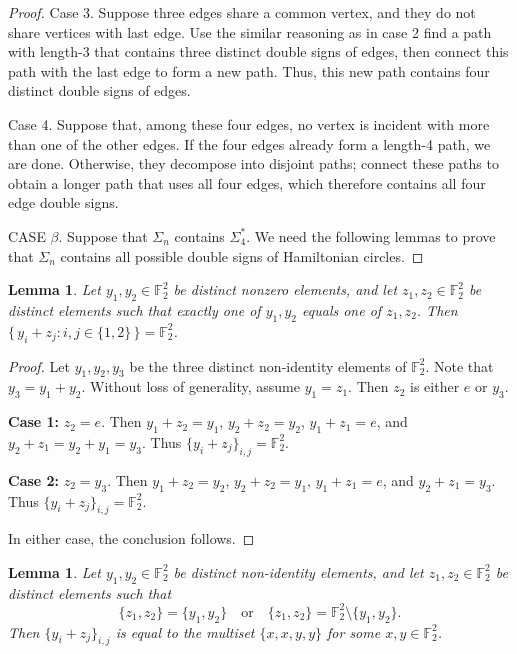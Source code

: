 \documentclass[12pt]{amsart}
\theoremstyle{plain}
\newtheorem{lemma}[theorem]{Lemma}
\theoremstyle{definition}%
\begin{document}
\begin{proof}
Case 3. Suppose three edges share a common vertex, and they do not share  vertices  with last edge. Use the similar reasoning as in case 2 find a path with length-3 that contains three distinct double signs of edges, then connect this path with the last edge to form a new path. Thus, this new path contains four distinct double signs of edges.


     Case 4.  Suppose that, among these four edges, no vertex is incident with more than one of the other edges. If the four edges already form a length-4 path, we are done. Otherwise, they decompose into disjoint paths; connect these paths to obtain a longer path that uses all four edges, which therefore contains all four edge double signs.



     
 \vspace{1cm}    

 
   CASE $\beta$. Suppose that \(\Sigma_n\)  contains $\Sigma_4^*$. We need the following lemmas to prove that \(\Sigma_n\)  contains all possible double signs of Hamiltonian circles.
    \end{proof}



\begin{lemma}\label{11}
Let \(y_1,y_2\in\mathbb F_2^2\) be distinct nonzero elements, and let \(z_1,z_2\in\mathbb F_2^2\) be distinct elements such that exactly one of \(y_1,y_2\) equals one of \(z_1,z_2\).
Then \(\{\,y_i+z_j: i,j\in\{1,2\}\,\}=\mathbb F_2^2\).

\end{lemma}

\begin{proof}
Let $y_1, y_2, y_3$ be the three distinct non-identity elements of $\mathbb{F}_2^2$.  
Note that $y_3 = y_1+ y_2$.  
Without loss of generality, assume $y_1 = z_1$.  
Then $z_2$ is either $e$ or $y_3$.

\textbf{Case 1:} $z_2 = e$.  
Then $y_1 +z_2 = y_1$, $y_2 +z_2 = y_2$, $y_1+ z_1 = e$, and $y_2+z_1 = y_2+ y_1 = y_3$.  
Thus $\{y_i +z_j\}_{i,j} = \mathbb{F}_2^2$.

\textbf{Case 2:} $z_2 = y_3$.  
Then $y_1+z_2 = y_2$, $y_2+ z_2 = y_1$, $y_1+ z_1 = e$, and $y_2 +z_1 = y_3$.  
Thus $\{y_i +z_j\}_{i,j} = \mathbb{F}_2^2$.

In either case, the conclusion follows.
\end{proof}



\begin{lemma}\label{12} 
Let $y_1, y_2 \in \mathbb{F}_2^2$ be distinct non-identity elements, and let $z_1, z_2 \in \mathbb{F}_2^2$ be distinct elements such that 
\[
\{z_1, z_2\} = \{y_1, y_2\} \quad \text{or} \quad \{z_1, z_2\} = \mathbb{F}_2^2 \setminus \{y_1, y_2\}.
\]
Then $\{y_i +z_j\}_{i,j}$ is equal to the multiset $\{x, x, y, y\}$ for some $x, y \in \mathbb{F}_2^2$.
\end{lemma}
\end{document}
